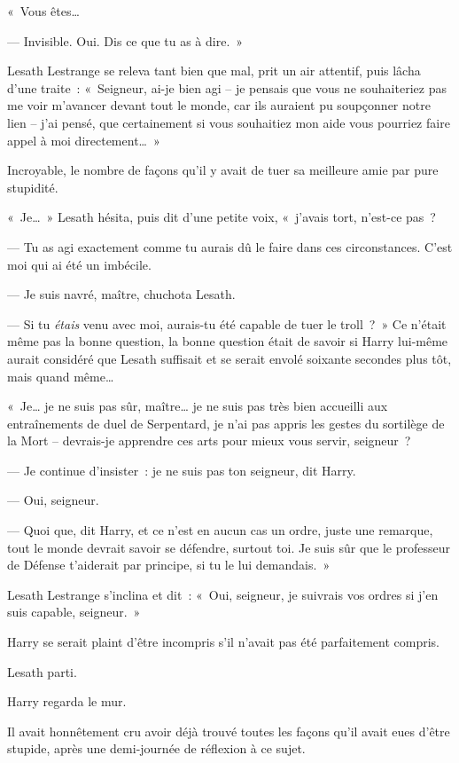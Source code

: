 «~Vous êtes…

--- Invisible. Oui. Dis ce que tu as à dire.~»

Lesath Lestrange se releva tant bien que mal, prit un air attentif, puis lâcha d'une traite~: «~Seigneur, ai-je bien agi -- je pensais que vous ne souhaiteriez pas me voir m'avancer devant tout le monde, car ils auraient pu soupçonner notre lien -- j'ai pensé, que certainement si vous souhaitiez mon aide vous pourriez faire appel à moi directement…~»

Incroyable, le nombre de façons qu'il y avait de tuer sa meilleure amie par pure stupidité.

«~Je…~» Lesath hésita, puis dit d'une petite voix, «~j'avais tort, n'est-ce pas~?

--- Tu as agi exactement comme tu aurais dû le faire dans ces circonstances. C'est moi qui ai été un imbécile.

--- Je suis navré, maître, chuchota Lesath.

--- Si tu \emph{étais} venu avec moi, aurais-tu été capable de tuer le troll~?~» Ce n'était même pas la bonne question, la bonne question était de savoir si Harry lui-même aurait considéré que Lesath suffisait et se serait envolé soixante secondes plus tôt, mais quand même…

«~Je… je ne suis pas sûr, maître… je ne suis pas très bien accueilli aux entraînements de duel de Serpentard, je n'ai pas appris les gestes du sortilège de la Mort -- devrais-je apprendre ces arts pour mieux vous servir, seigneur~?

--- Je continue d'insister~: je ne suis pas ton seigneur, dit Harry.

--- Oui, seigneur.

--- Quoi que, dit Harry, et ce n'est en aucun cas un ordre, juste une remarque, tout le monde devrait savoir se défendre, surtout toi. Je suis sûr que le professeur de Défense t'aiderait par principe, si tu le lui demandais.~»

Lesath Lestrange s'inclina et dit~: «~Oui, seigneur, je suivrais vos ordres si j'en suis capable, seigneur.~»

Harry se serait plaint d'être incompris s'il n'avait pas été parfaitement compris.

Lesath parti.

Harry regarda le mur.

Il avait honnêtement cru avoir déjà trouvé toutes les façons qu'il avait eues d'être stupide, après une demi-journée de réflexion à ce sujet.

